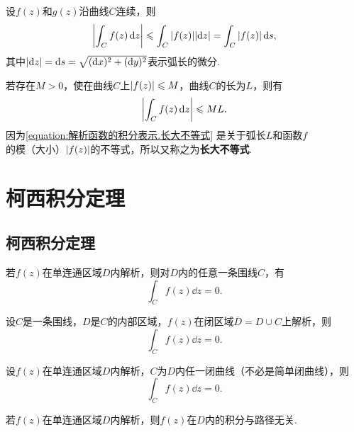 \begin{theorem}
设\(f(z)\)和\(g(z)\)沿曲线\(C\)连续，则\[
\abs{\int_C f(z) \dd{z}}
\leqslant \int_C{\abs{f(z)}\abs{\dd{z}}}
= \int_C{\abs{f(z)}\dd{s}},
\]其中\(\abs{\dd{z}}=\dd{s}=\sqrt{(\dd{x})^2+(\dd{y})^2}\)表示弧长的微分.
\end{theorem}

\begin{corollary}[积分估值定理]\label{theorem:解析函数的积分表示.积分估值定理}
若存在\(M > 0\)，使在曲线\(C\)上\(\abs{f(z)} \leqslant M\)，曲线\(C\)的长为\(L\)，则有\begin{equation}\label{equation:解析函数的积分表示.长大不等式}
\abs{\int_C f(z) \dd{z}} \leqslant ML.
\end{equation}\rm
因为\cref{equation:解析函数的积分表示.长大不等式} 是关于弧长\(L\)和函数\(f\)的模（大小）\(\abs{f(z)}\)的不等式，所以又称之为\textbf{长大不等式}.
\end{corollary}

\section{柯西积分定理}
\subsection{柯西积分定理}
\begin{theorem}[柯西积分定理]\label{theorem:解析函数的积分表示.柯西积分定理}
若\(f(z)\)在单连通区域\(D\)内解析，则对\(D\)内的任意一条围线\(C\)，有\[
\int_C f(z) \dd{z}=0.
\]
\end{theorem}

\begin{theorem}\label{theorem:解析函数的积分表示.柯西积分定理.闭区域的情形}
设\(C\)是一条围线，\(D\)是\(C\)的内部区域，\(f(z)\)在闭区域\(\overline{D}=D \cup C\)上解析，则\[
\int_C f(z) \dd{z}=0.
\]
\end{theorem}

\begin{corollary}\label{theorem:解析函数的积分表示.柯西积分定理.非简单闭曲线的情形}
设\(f(z)\)在单连通区域\(D\)内解析，\(C\)为\(D\)内任一闭曲线（不必是简单闭曲线），则\[
\int_C f(z) \dd{z} = 0.
\]
\end{corollary}

\begin{corollary}\label{theorem:解析函数的积分表示.解析函数在解析区域内的积分与路径无关}
若\(f(z)\)在单连通区域\(D\)内解析，则\(f(z)\)在\(D\)内的积分与路径无关.
\end{corollary}

